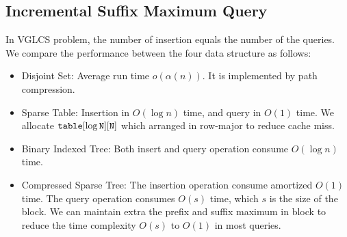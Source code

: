 
\subsection{Incremental Suffix Maximum Query}

In VGLCS problem, the number of insertion equals the number of the
queries. We compare the performance between the four data structure as
follows:

\iffalse
針對插入和詢問次數相同的 ISMQ 問題，運行以下四種數據結構：
\fi

\begin{itemize}
  \item 

Disjoint Set: Average run time $o(\alpha(n))$.  It is implemented by
path compression.

  \item 

Sparse Table: Insertion in $O(\log n)$ time, and query in $O(1)$ time.
We allocate $\tt{table}[\log N][N]$ which arranged in row-major to
reduce cache miss.

  \item 

Binary Indexed Tree: Both insert and query operation consume $O(\log
n)$ time.

  \item 

Compressed Sparse Tree: The insertion operation consume amortized
$O(1)$ time.  The query operation consumes $O(s)$ time, which $s$ is
the size of the block.  We can maintain extra the prefix and suffix
maximum in block to reduce the time complexity $O(s)$ to $O(1)$ in
most queries.

\end{itemize}

\iffalse
\begin{itemize}
  \item 并查集 (Disjoint Set): 平均運行時間 $o(\alpha(n))$。只使用路徑壓縮技巧。
  \item 稀疏表 (Sparse Table): 插入 $O(\log n)$、詢問 $O(1)$。實作陣列宣告採用 $\tt{table}[\log N][N]$ 以減少快取未中。
  \item 樹狀數組 (Binary Indexed Tree): 插入、詢問均為 $O(\log n)$。
  \item 壓縮稀疏表 (Compressed Sparse Tree): 插入均攤 $O(1)$、詢問操作 $O(s)$，
  其中 $s$ 為拆分到區塊大小。實作時，維護區塊前綴和後綴最大值降低詢問複雜度至 $O(1)$，當發生 in-block 詢問再運行 $O(s)$ 算法。
\end{itemize}
\fi

